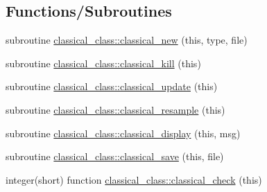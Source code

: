 \subsection*{Functions/\+Subroutines}
\begin{DoxyCompactItemize}
\item 
subroutine \hyperlink{namespaceclassical__class_a6e5dda0e17a3e5cb552a289231d488fd}{classical\+\_\+class\+::classical\+\_\+new} (this, type, file)
\item 
subroutine \hyperlink{namespaceclassical__class_a88946a9bda2bac6d08860b7d96cf5219}{classical\+\_\+class\+::classical\+\_\+kill} (this)
\item 
subroutine \hyperlink{namespaceclassical__class_afb802bbd3f8834f449275a0bdab55677}{classical\+\_\+class\+::classical\+\_\+update} (this)
\item 
subroutine \hyperlink{namespaceclassical__class_a9b5ff74fe77b1370f4ca34d3bb3783c9}{classical\+\_\+class\+::classical\+\_\+resample} (this)
\item 
subroutine \hyperlink{namespaceclassical__class_ac2d45f3adc9cbe9dcf22b9905ba1f649}{classical\+\_\+class\+::classical\+\_\+display} (this, msg)
\item 
subroutine \hyperlink{namespaceclassical__class_a961b68acb4e6f345ae596a8424866657}{classical\+\_\+class\+::classical\+\_\+save} (this, file)
\item 
integer(short) function \hyperlink{namespaceclassical__class_ab91ea3d44c25f7d544b297e0b1a4f00a}{classical\+\_\+class\+::classical\+\_\+check} (this)
\end{DoxyCompactItemize}
